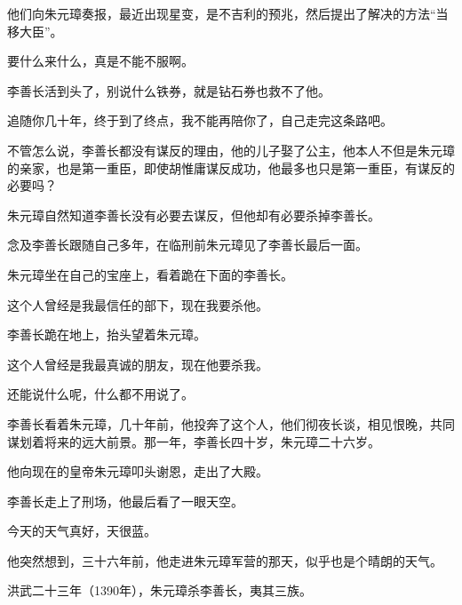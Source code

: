 \begin{multicols}{\theparacolNo}
		他们向朱元璋奏报，最近出现星变，是不吉利的预兆，然后提出了解决的方法“当移大臣”。

		要什么来什么，真是不能不服啊。

		李善长活到头了，别说什么铁券，就是钻石券也救不了他。

		追随你几十年，终于到了终点，我不能再陪你了，自己走完这条路吧。

		不管怎么说，李善长都没有谋反的理由，他的儿子娶了公主，他本人不但是朱元璋的亲家，也是第一重臣，即使胡惟庸谋反成功，他最多也只是第一重臣，有谋反的必要吗？

		朱元璋自然知道李善长没有必要去谋反，但他却有必要杀掉李善长。

		念及李善长跟随自己多年，在临刑前朱元璋见了李善长最后一面。

		朱元璋坐在自己的宝座上，看着跪在下面的李善长。

		这个人曾经是我最信任的部下，现在我要杀他。

		李善长跪在地上，抬头望着朱元璋。

		这个人曾经是我最真诚的朋友，现在他要杀我。

		还能说什么呢，什么都不用说了。

		李善长看着朱元璋，几十年前，他投奔了这个人，他们彻夜长谈，相见恨晚，共同谋划着将来的远大前景。那一年，李善长四十岁，朱元璋二十六岁。

		他向现在的皇帝朱元璋叩头谢恩，走出了大殿。

		李善长走上了刑场，他最后看了一眼天空。

		今天的天气真好，天很蓝。

		他突然想到，三十六年前，他走进朱元璋军营的那天，似乎也是个晴朗的天气。

		洪武二十三年（1390年），朱元璋杀李善长，夷其三族。
		\ifnum{}
	\end{multicols}
\fi
\newpage
